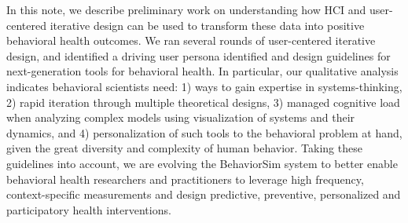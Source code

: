 \documentclass{sigchi}
\begin{document}
In this note, we describe preliminary work on understanding how HCI and user-centered iterative design can be used to transform these data into positive behavioral health outcomes.  
We ran several rounds of user-centered iterative design, and identified a driving user persona identified and design guidelines for next-generation tools for behavioral health. 
In particular, our qualitative analysis indicates behavioral scientists need: 1) ways to gain expertise in systems-thinking, 2) rapid iteration through multiple theoretical designs, 3) managed cognitive load when analyzing complex models using visualization of systems and their dynamics, and 4) personalization of such tools to the behavioral problem at hand, given the great diversity and complexity of human behavior.
Taking these guidelines into account, we are evolving the BehaviorSim system to better enable behavioral health researchers and practitioners to  leverage high frequency, context-specific measurements and design predictive, preventive, personalized and participatory health interventions\cite{hood2011predictive}.


%
%
%
%
%
\balance{}



\end{document}
